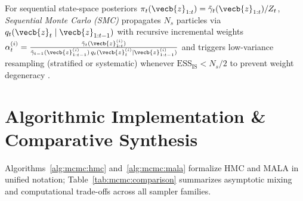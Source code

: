 \documentclass[../../../../master.tex]{subfiles}
\begin{document}
For sequential state-space posteriors $\pi_t(\vecb{z}_{1:t}) = \tilde{\gamma}_t(\vecb{z}_{1:t})/Z_t$, \emph{Sequential Monte Carlo (SMC)} propagates $N_s$ particles via $q_t(\vecb{z}_t \mid \vecb{z}_{1:t-1})$ with recursive incremental weights $\alpha_t^{(i)} = \frac{\tilde{\gamma}_t(\vecb{z}_{1:t}^{(i)})}{\tilde{\gamma}_{t-1}(\vecb{z}_{1:t-1}^{(i)})\,q_t(\vecb{z}_t^{(i)} \mid \vecb{z}_{1:t-1}^{(i)})}$ and triggers low-variance resampling (stratified or systematic) whenever $\mathrm{ESS}_{\mathrm{IS}} < N_s/2$ to prevent weight degeneracy .

\section{Algorithmic Implementation \& Comparative Synthesis}
\label{sec:mcmc:algorithms}

Algorithms~\ref{alg:mcmc:hmc} and~\ref{alg:mcmc:mala} formalize HMC and MALA in unified notation; Table~\ref{tab:mcmc:comparison} summarizes asymptotic mixing and computational trade-offs across all sampler families.

\begin{algorithm}[htbp]
\caption{Hamiltonian Monte Carlo (HMC) with Symplectic Leapfrog Integrator}
\label{alg:mcmc:hmc}
\end{algorithm}
\end{document}
